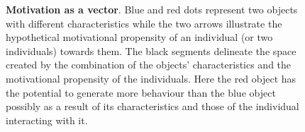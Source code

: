 \begin{figure}[h]
\begin{center}
\begin{adjustbox}{width=0.5\columnwidth}
\begin{tikzpicture}[x=0.75pt,y=0.75pt,yscale=-1,xscale=1]
            
            
            
            \end{tikzpicture}
    \end{adjustbox}
  \end{center}
\caption{\textbf{Motivation as a vector}. Blue and red dots represent two objects with different characteristics while the two arrows illustrate the hypothetical motivational propensity of an individual (or two individuals) towards them. The black segments delineate the space created by the combination of the objects' characteristics and the motivational propensity of the individuals. Here the red object has the potential to generate more behaviour than the blue object possibly as a result of its characteristics and those of the individual interacting with it.}
\label{fig: vect_mot}
\end{figure}